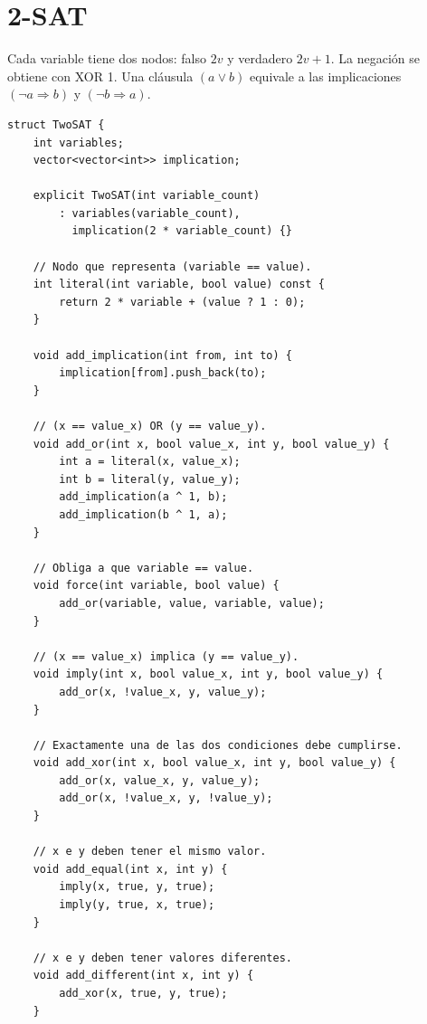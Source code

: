 \section{2-SAT}

Cada variable tiene dos nodos: falso $2v$ y verdadero $2v+1$. La negación se
obtiene con XOR 1. Una cláusula $(a\lor b)$ equivale a las implicaciones
$(\neg a\Rightarrow b)$ y $(\neg b\Rightarrow a)$.


\begin{lstlisting}[style=cpp]
struct TwoSAT {
    int variables;
    vector<vector<int>> implication;

    explicit TwoSAT(int variable_count)
        : variables(variable_count),
          implication(2 * variable_count) {}

    // Nodo que representa (variable == value).
    int literal(int variable, bool value) const {
        return 2 * variable + (value ? 1 : 0);
    }

    void add_implication(int from, int to) {
        implication[from].push_back(to);
    }

    // (x == value_x) OR (y == value_y).
    void add_or(int x, bool value_x, int y, bool value_y) {
        int a = literal(x, value_x);
        int b = literal(y, value_y);
        add_implication(a ^ 1, b);
        add_implication(b ^ 1, a);
    }

    // Obliga a que variable == value.
    void force(int variable, bool value) {
        add_or(variable, value, variable, value);
    }

    // (x == value_x) implica (y == value_y).
    void imply(int x, bool value_x, int y, bool value_y) {
        add_or(x, !value_x, y, value_y);
    }

    // Exactamente una de las dos condiciones debe cumplirse.
    void add_xor(int x, bool value_x, int y, bool value_y) {
        add_or(x, value_x, y, value_y);
        add_or(x, !value_x, y, !value_y);
    }

    // x e y deben tener el mismo valor.
    void add_equal(int x, int y) {
        imply(x, true, y, true);
        imply(y, true, x, true);
    }

    // x e y deben tener valores diferentes.
    void add_different(int x, int y) {
        add_xor(x, true, y, true);
    }


\end{lstlisting}
